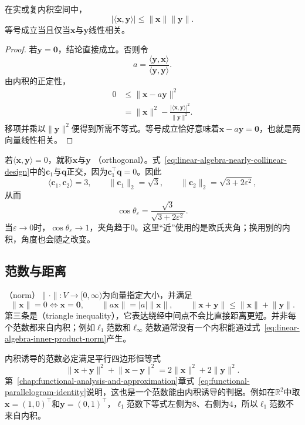 \begin{theorem}
\label{thm:linear-algebra-cauchy-schwarz}
在实或复内积空间中，
\[
  |\langle\bm{x},\bm{y}\rangle|
  \leq
  \lVert\bm{x}\rVert\lVert\bm{y}\rVert.
\]
等号成立当且仅当$\bm{x}$与$\bm{y}$线性相关。
\end{theorem}

\begin{proof}
若$\bm{y}=\bm{0}$，结论直接成立。否则令
\[
  a=\frac{\langle\bm{y},\bm{x}\rangle}
          {\langle\bm{y},\bm{y}\rangle}.
\]
由内积的正定性，
\begin{align*}
  0
  &\leq
  \lVert\bm{x}-a\bm{y}\rVert^2\\
  &=
  \lVert\bm{x}\rVert^2
  -
  \frac{|\langle\bm{x},\bm{y}\rangle|^2}
       {\lVert\bm{y}\rVert^2}.
\end{align*}
移项并乘以$\lVert\bm{y}\rVert^2$便得到所需不等式。等号成立恰好意味着$\bm{x}-a\bm{y}=\bm{0}$，也就是两向量线性相关。
\end{proof}

若$\langle\bm{x},\bm{y}\rangle=0$，就称$\bm{x}$与$\bm{y}$ （orthogonal）。式~\eqref{eq:linear-algebra-nearly-collinear-design}中的$\bm{c}_1$与$\bm{q}$正交，因为$\bm{c}_1^{\top}\bm{q}=0$。因此
\[
  \langle\bm{c}_1,\bm{c}_2\rangle=3,\qquad
  \lVert\bm{c}_1\rVert_2=\sqrt{3},\qquad
  \lVert\bm{c}_2\rVert_2=\sqrt{3+2\varepsilon^2},
\]
从而
\begin{equation}
  \cos\theta_{\varepsilon} = \frac{\sqrt{3}}{\sqrt{3+2\varepsilon^2}}. \label{eq:linear-algebra-nearly-collinear-angle}
\end{equation}
当$\varepsilon\to0$时，$\cos\theta_{\varepsilon}\to1$，夹角趋于$0$。这里“近”使用的是欧氏夹角；换用别的内积，角度也会随之改变。

\subsection{范数与距离}

（norm）$\lVert\cdot\rVert:V\to[0,\infty)$为向量指定大小，并满足
\[
  \lVert\bm{x}\rVert=0\Longleftrightarrow\bm{x}=\bm{0},\qquad
  \lVert a\bm{x}\rVert=|a|\lVert\bm{x}\rVert,\qquad
  \lVert\bm{x}+\bm{y}\rVert
  \leq
  \lVert\bm{x}\rVert+\lVert\bm{y}\rVert.
\]
第三条是（triangle inequality），它表达绕经中间点不会比直接距离更短。并非每个范数都来自内积；例如$\ell_1$范数和$\ell_{\infty}$范数通常没有一个内积能通过式~\eqref{eq:linear-algebra-inner-product-norm}产生。

内积诱导的范数必定满足平行四边形恒等式
\[
  \lVert\bm{x}+\bm{y}\rVert^2
  +
  \lVert\bm{x}-\bm{y}\rVert^2
  =
  2\lVert\bm{x}\rVert^2
  +
  2\lVert\bm{y}\rVert^2.
\]
第~\ref{chap:functional-analysis-and-approximation}章式~\eqref{eq:functional-parallelogram-identity}说明，这也是一个范数能由内积诱导的判据。例如在$\mathbb{R}^2$中取$\bm{x}=(1,0)^{\top}$和$\bm{y}=(0,1)^{\top}$，$\ell_1$范数下等式左侧为$8$、右侧为$4$，所以$\ell_1$范数不来自内积。

